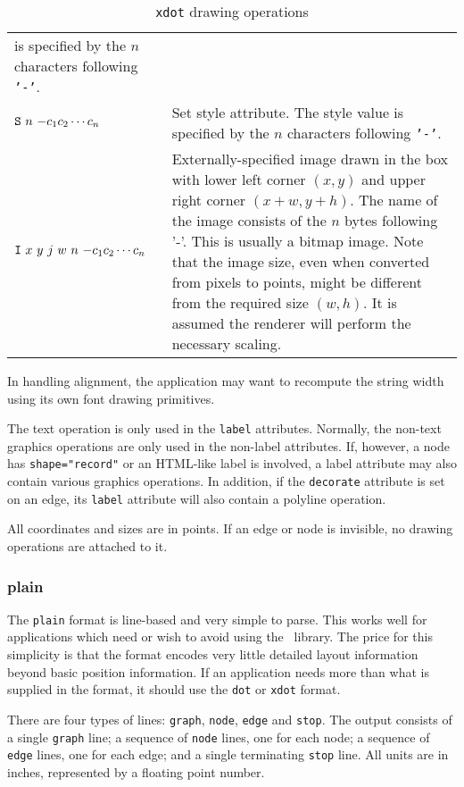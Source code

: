 \begin{table}[htb]
\begin{tabular}[t]{|lp{4.5in}|}
is specified by the $n$ characters following {\tt '-'}. \\
${\tt S}\ n\ {\tt -}c_{1}c_{2}\cdots c_{n}$ & Set style attribute. The
style value is specified by the $n$ characters following {\tt '-'}. \\
${\tt I}\ x\ y\ j\ w\ n\ {\tt -}c_{1}c_{2}\cdots c_{n}$ &
Externally-specified image drawn in the box with lower left corner $(x,y)$ 
and upper right corner $(x+w,y+h)$. The name of the image consists of the $n$ bytes following '-'. This is usually a bitmap image. Note that the image size, even when converted from pixels to points, might be different from the required size $(w,h)$. It is assumed the renderer will perform the necessary scaling.\\
\hline
\end{tabular}
\caption{{\tt xdot} drawing operations}
\label{table:xops}
\end{table}

In handling alignment, the application may want to recompute the string 
width using its own font drawing primitives. 

The text operation is only used in the {\tt label} attributes. 
Normally, the non-text graphics 
operations are only used in the non-label attributes.
If, however, a node has {\tt shape="record"} or an HTML-like label is
involved, a label attribute may also contain various graphics operations.
In addition, if the {\tt decorate} attribute is set on an edge, its 
{\tt label} attribute will also contain a polyline operation. 

All coordinates and sizes are in points.
If an edge or 
node is invisible, no drawing operations are attached to it.

\subsubsection{plain}

The {\tt plain} format is line-based and very simple to parse. This works
well for applications which need or wish to avoid using the \graph\
library. The price for this simplicity is that the format
encodes very little detailed layout information beyond basic position
information. If an application needs more than what is supplied in the
format, it should use the {\tt dot} or {\tt xdot} format.

There are four types of lines: {\tt graph}, {\tt node}, 
{\tt edge} and {\tt stop}. The output
consists of a single {\tt graph} line; a sequence of {\tt node} lines, one
for each node; a sequence of {\tt edge} lines, one for each edge; and
a single terminating {\tt stop} line. All units are in inches,
represented by a floating point number. 

